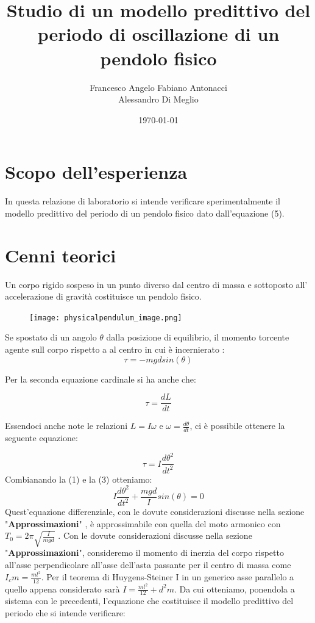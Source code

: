 \documentclass[11pt]{article}
\title{Studio di un modello predittivo del periodo di oscillazione di un pendolo fisico}
\author{Francesco Angelo Fabiano Antonacci\\Alessandro Di Meglio}
\date{\today}
\begin{document}
\maketitle

\section{Scopo dell'esperienza}

In questa relazione di laboratorio si intende verificare sperimentalmente il modello predittivo del periodo di un pendolo fisico dato dall'equazione (5).

\section{Cenni teorici}

Un corpo rigido sospeso in un punto diverso dal centro di massa e sottoposto all' accelerazione di gravità costituisce un pendolo fisico.
\begin{figure}[htbp]
\centerline{\texttt{[image: physicalpendulum\_image.png]}}

\label{fig}
\end{figure}

Se spostato di un angolo $\theta$ dalla posizione di equilibrio, il momento torcente agente sull corpo rispetto a al centro in cui è incernierato :
\begin{equation}
\tau  = -mgd sin(\theta)
\end{equation}

Per la seconda equazione cardinale si ha anche che:


\begin{equation}
\tau  =\frac{dL}{dt}
\end{equation}

Essendoci anche note le relazioni $L=I\omega  $ e $\omega=\frac{d\theta}{dt}$, ci è possibile ottenere la seguente equazione:

\begin{equation}
\tau=I\frac{d\theta^2}{dt^2}
\end{equation}
Combianando la (1) e la (3) otteniamo:
\begin{equation}
I\frac{d\theta^2}{dt^2}+\frac{mgd}{I}sin(\theta)=0
\end{equation}
Quest'equazione differenziale, con le dovute considerazioni discusse nella sezione "\textbf {Approssimazioni}" , è approssimabile con quella del moto armonico con $T_0=2\pi\sqrt{\frac{I}{mgd}}$ .
Con le dovute considerazioni discusse nella sezione "\textbf {Approssimazioni}", consideremo il momento di inerzia del corpo rispetto all'asse perpendicolare all'asse dell'asta passante per il centro di massa come $I_cm=\frac{ml^2}{12}$.
Per il teorema di Huygens-Steiner I in un generico asse parallelo a quello appena considerato sarà $I=\frac{ml^2}{12}+d^2m$.
Da cui otteniamo, ponendola a sistema con le precedenti, l'equazione che costituisce il modello predittivo del periodo che si intende verificare:
\end{document}
